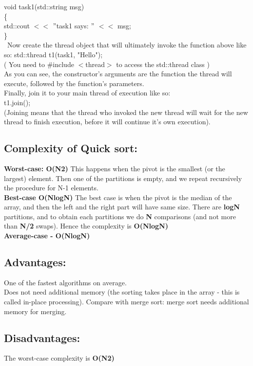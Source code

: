 \documentclass{article}
\begin{document}
	void task1(std::string msg)\\
	\{\ \\
	std::cout $<<$ $"$task1 says: $"$ $<<$ msg; \\
	\}\\\
	Now create the thread object that will ultimately invoke the function above like so:
	std::thread t1(task1, "Hello");\\
	( You need to \#include $<$thread$>$ to access the std::thread class )\\
	As you can see, the constructor's arguments are the function the thread will execute, followed by the function's parameters.\\
	Finally, join it to your main thread of execution like so:\\
	t1.join(); \\
	(Joining means that the thread who invoked the new thread will wait for the new thread to finish execution, before it will continue it's own execution).\\
	
	\subsection{ Complexity of Quick sort:}
	
	\textbf{Worst-case: O(N2)}
	This happens when the pivot is the smallest (or the largest) element. 
	Then one of the partitions is empty, and we repeat recursively the procedure for N-1 elements.\\
	\textbf{Best-case O(NlogN)} The best case is when the pivot is the median of the array, 
	and then the left and the right part will have same size.
	There are \textbf{logN} partitions, and to obtain each partitions we do \textbf{N} comparisons 
	(and not more than \textbf{N/2} swaps). Hence the complexity is \textbf{O(NlogN)}\\
	\textbf{Average-case - O(NlogN)}
	
	\subsection{ Advantages: }
	One of the fastest algorithms on average. \\
	Does not need additional memory (the sorting takes place in the array - this is called in-place processing). Compare with merge sort: merge sort needs additional memory for merging. 
	\subsection{ Disadvantages:}
	The worst-case complexity is \textbf{ O(N2)}
\end{document}
